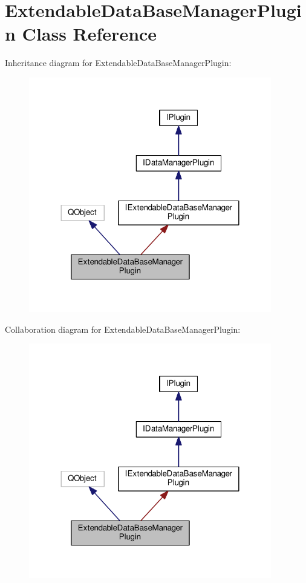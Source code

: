 \hypertarget{class_extendable_data_base_manager_plugin}{}\section{Extendable\+Data\+Base\+Manager\+Plugin Class Reference}
\label{class_extendable_data_base_manager_plugin}


Inheritance diagram for Extendable\+Data\+Base\+Manager\+Plugin\+:\nopagebreak
\begin{figure}[H]
\begin{center}
\leavevmode
\includegraphics[width=300pt]{class_extendable_data_base_manager_plugin__inherit__graph}
\end{center}
\end{figure}


Collaboration diagram for Extendable\+Data\+Base\+Manager\+Plugin\+:\nopagebreak
\begin{figure}[H]
\begin{center}
\leavevmode
\includegraphics[width=300pt]{class_extendable_data_base_manager_plugin__coll__graph}
\end{center}
\end{figure}

